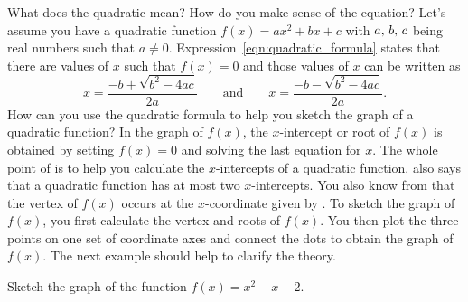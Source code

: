 \documentclass[a4paper,oneside,12pt]{article}
\begin{document}
What does the quadratic  mean?  How do
you make sense of the equation?  Let's assume you have a quadratic
function $f(x) = ax^2 + bx + c$ with ${a},\, {b},\, {c}$ being real
numbers such that $a \neq 0$.
Expression~\eqref{eqn:quadratic_formula} states that there are values
of $x$ such that $f(x) = 0$ and those values of $x$ can be written as
\[
x
=
\frac{
  -b + \sqrt{b^2 - 4ac}
}{
  2a
}
\qquad
\text{and}
\qquad
x
=
\frac{
  -b - \sqrt{b^2 - 4ac}
}{
  2a
}.
\]
How can you use the quadratic formula to help you sketch the graph of
a quadratic function?  In the graph of $f(x)$, the $x$-intercept or
root of $f(x)$ is obtained by setting $f(x) = 0$ and solving the last
equation for $x$.  The whole point of 
is to help you calculate the $x$-intercepts of a quadratic function.
 also says that a quadratic function
has at most two $x$-intercepts.  You also know
from  that the vertex of $f(x)$ occurs at
the $x$-coordinate given by .
To sketch the graph of $f(x)$, you first calculate the vertex and
roots of $f(x)$.  You then plot the three points on one set of
coordinate axes and connect the dots to obtain the graph of $f(x)$.
The next example should help to clarify the theory.

\begin{example}
Sketch the graph of the function $f(x) = x^2 - x - 2$.
\end{example}
\end{document}
